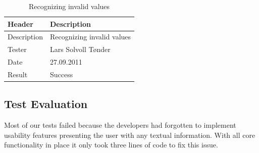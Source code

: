 \begin{table}[!htb] \footnotesize \center
\caption{Supporting \#define and \#if \label{tab:sp1_tid05}}
\noindent{}
\end{table}

\begin{table}[!htb] \footnotesize \center
\caption{Supporting configuration files \label{tab:sp1_tid06}}
\noindent{}
\end{table}

\begin{table}[!htb] \footnotesize \center
\caption{Recognizing invalid values \label{tab:sp1_tid07}}
\begin{tabular}{l l}
	\toprule
	Header & Description \\
	\midrule
	Description &  Recognizing invalid values  \\
	Tester & Lars Solvoll Tønder \\
	Date & 27.09.2011 \\
	Result & Success\\
	\bottomrule
\end{tabular}
\end{table}

\subsection{Test Evaluation}
Most of our tests failed because the developers had forgotten to implement
usability features presenting the user with any textual information. With all
core functionality in place it only took three lines of code to fix this issue.


